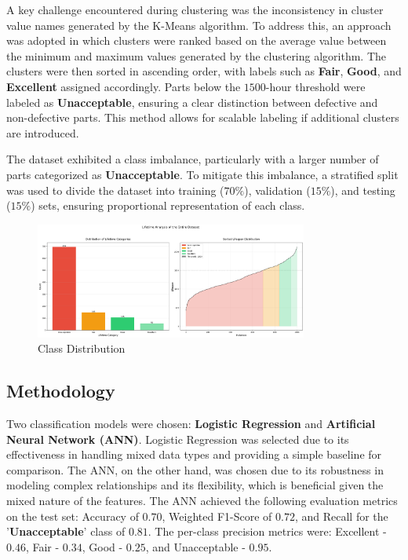 \documentclass{article}
\begin{document}
A key challenge encountered during clustering was the inconsistency in cluster value names generated by the K-Means algorithm. To address this, an approach was adopted in which clusters were ranked based on the average value between the minimum and maximum values generated by the clustering algorithm. The clusters were then sorted in ascending order, with labels such as \textbf{Fair}, \textbf{Good}, and \textbf{Excellent} assigned accordingly. Parts below the $1500$-hour threshold were labeled as \textbf{Unacceptable}, ensuring a clear distinction between defective and non-defective parts. This method allows for scalable labeling if additional clusters are introduced.

The dataset exhibited a class imbalance, particularly with a larger number of parts categorized as \textbf{Unacceptable}. To mitigate this imbalance, a stratified split was used to divide the dataset into training ($70\%$), validation ($15\%$), and testing ($15\%$) sets, ensuring proportional representation of each class.

\begin{figure}[htbp]
    \centering
    \includegraphics[width=0.8\textwidth]{./Images/ClassDistribution.png}
    \caption{Class Distribution}
    \label{fig:class_distribution}
\end{figure}


\subsection{Methodology}

Two classification models were chosen: \textbf{Logistic Regression} and \textbf{Artificial Neural Network (ANN)}. Logistic Regression was selected due to its effectiveness in handling mixed data types and providing a simple baseline for comparison. The ANN, on the other hand, was chosen due to its robustness in modeling complex relationships and its flexibility, which is beneficial given the mixed nature of the features. The ANN achieved the following evaluation metrics on the test set: Accuracy of $0.70$, Weighted F1-Score of $0.72$, and Recall for the '\textbf{Unacceptable}' class of $0.81$. The per-class precision metrics were: Excellent - $0.46$, Fair - $0.34$, Good - $0.25$, and Unacceptable - $0.95$.
\end{document}
